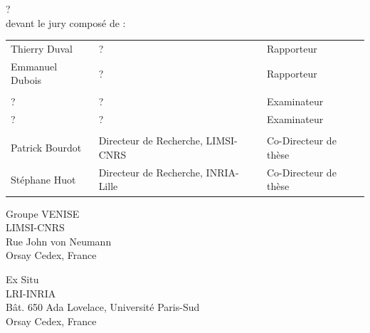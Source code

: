 \begin{titlepage}
?\\

devant le jury composé de :\\
\begin{center}
	\begin{tabular}{l l l}
	
	Thierry Duval		&?			& Rapporteur	\\ 
	Emmanuel Dubois		&?			& Rapporteur	\\
						&			&				\\ %
	?					&?		 	& Examinateur	\\ 
	?					&?			& Examinateur	\\ 
	& 					&\\	
	Patrick Bourdot 	& Directeur de Recherche, LIMSI-CNRS	& Co-Directeur de thèse\\ 
	Stéphane Huot		& Directeur de Recherche, INRIA-Lille	& Co-Directeur de thèse\\ 
		
	\end{tabular}
\end{center}


\setlength{\columnsep}{7mm}
\setlength{\columnseprule}{0pt}

\begin{multicols}{2} 
\small 
\noindent Groupe VENISE					\\	
\noindent LIMSI-CNRS					\\
\noindent Rue John von Neumann			\\
 Orsay Cedex, France		\\	

\columnbreak

\raggedleft Ex Situ										\\
\noindent LRI-INRIA										\\
\noindent Bât. 650 Ada Lovelace, Université Paris-Sud	\\
 Orsay Cedex, France
\end{multicols}



\end{titlepage}